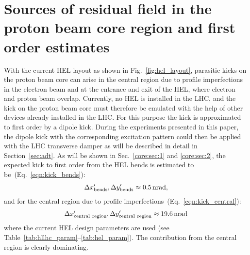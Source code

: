 \documentclass[%
 reprint,
 amsmath,amssymb,
 aps,
prstab,
]{revtex4-1}
\begin{document}
\section{Sources of residual field in the proton beam core region and first order estimates\label{sec:core}}
With the current HEL layout as shown in Fig.~\ref{fig:hel_layout}, parasitic kicks on the proton beam core can arise in the central region due to profile imperfections in the electron beam and at the entrance and exit of the HEL, where electron and proton beam overlap. Currently, no HEL is installed in the LHC, and the kick on the proton beam core must therefore be emulated with the help of other devices already installed in the LHC. For this purpose the kick is approximated to first order by a dipole kick. During the experiments presented in this paper, the dipole kick with the corresponding excitation pattern could then be applied with the LHC transverse damper as will be described in detail in Section~\ref{sec:adt}. As will be shown in Sec.~\ref{core:sec:1} and \ref{core:sec:2}, the expected kick to first order from the HEL bends is estimated to be~(Eq.~\ref{eqn:kick_bends}):
\begin{equation}
	\Delta x'_{\rm{bends}},\Delta y'_{\rm{bends}}\approx \SI{0.5}{nrad},
\end{equation}
and for the central region due to profile imperfections~(Eq.~\ref{eqn:kick_central}):
\begin{equation}
	\Delta x'_{\rm{central \ region}}, \Delta y'_{\rm{central \ region}} \approx \SI{19.6}{nrad} %
\end{equation}
where the current HEL design parameters are used (see Table~\ref{tab:hllhc_param}--\ref{tab:hel_param}). The contribution from the central region is clearly dominating.
\end{document}
